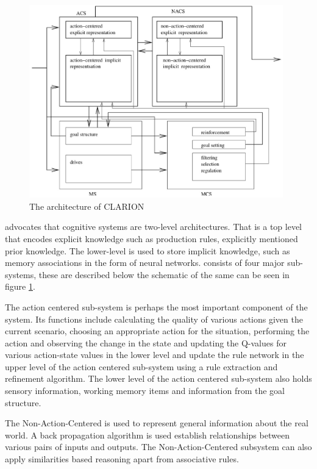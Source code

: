 \begin{figure}[htp]
  \centering
  \includegraphics[width=110mm]{CLARION.eps}
  \caption{The architecture of CLARION\cite{citeulike:3439185}}
  \label{CLARION_ARCH}
\end{figure}

\clarion advocates that cognitive systems are two-level
architectures. That is a top level that encodes explicit knowledge
such as production rules, explicitly mentioned prior knowledge. The
lower-level is used to store implicit knowledge, such as memory
associations in the form of neural networks. \clarion consists of four
major sub-systems, these are described below the schematic of the same
can be seen in figure \ref{CLARION_ARCH}.

The action centered sub-system is perhaps the most important component
of the system. Its functions include calculating the quality of
various actions given the current scenario, choosing an appropriate
action for the situation, performing the action and observing the
change in the state and updating the Q-values for various action-state
values in the lower level and update the rule network in the upper
level of the action centered sub-system using a rule extraction and
refinement algorithm. The lower level of the action centered
sub-system also holds sensory information, working memory items and
information from the goal structure\cite{Sun:2003aa}.

The Non-Action-Centered is used to represent general information about
the real world. A back propagation algorithm is used establish
relationships between various pairs of inputs and outputs. The
Non-Action-Centered subsystem can also apply similarities based
reasoning apart from associative rules. 

